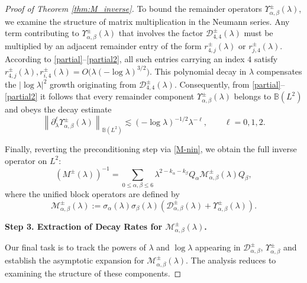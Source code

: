 \documentclass[reqno]{amsart}
\numberwithin{equation}{section}
\begin{document}
\begin{proof}[Proof of Theorem \ref{thm:M_inverse}]
To bound the remainder operators $\Upsilon_{\alpha,\beta}^\pm(\lambda)$, we examine the structure of matrix multiplication in the Neumann series.
Any term contributing to $\Upsilon_{\alpha,\beta}^\pm(\lambda)$ that involves the factor $\mathcal{D}_{4,4}^{\pm}(\lambda)$ must be multiplied by an adjacent remainder entry of the form $r_{4,j}^\pm(\lambda)$ or $r_{j,4}^\pm(\lambda)$. According to \eqref{partial}--\eqref{partial2}, all such entries carrying an index $4$ satisfy $r_{4,j}^{\pm}(\lambda), r_{i,4}^{\pm}(\lambda) = O\bigl(\lambda (-\log \lambda)^{3/2}\bigr)$. This polynomial decay in $\lambda$ compensates the $|\log \lambda|^2$ growth originating from $\mathcal{D}_{4,4}^{\pm}(\lambda)$. Consequently, from \eqref{partial}--\eqref{partial2} it follows that every remainder component $\Upsilon_{\alpha,\beta}^\pm(\lambda)$ belongs to $\mathbb{B}(L^2)$ and obeys the decay estimate
\begin{equation}\label{Upsilon}
\left\|\partial_\lambda^\ell \Upsilon_{\alpha,\beta}^\pm(\lambda)\right\|_{\mathbb{B}(L^2)} \lesssim (-\log \lambda)^{-1/2} \lambda^{-\ell}, \qquad \ell = 0,1,2. 
\end{equation}

Finally, reverting the preconditioning step via \eqref{M-nin}, we obtain the full inverse operator on $L^2$:
\[
\left(M^{\pm}(\lambda)\right)^{-1} = \sum_{0 \le \alpha, \beta \le 6} \lambda^{2 - k_\alpha - k_\beta} Q_\alpha \mathcal{M}_{\alpha,\beta}^{\pm}(\lambda) Q_\beta,
\]
where the unified block operators are  defined by
\[
\mathcal{M}_{\alpha,\beta}^{\pm}(\lambda) := \sigma_\alpha(\lambda) \sigma_\beta(\lambda) \left(\mathcal{D}_{\alpha,\beta}^\pm(\lambda) + \Upsilon_{\alpha,\beta}^\pm(\lambda) \right).
\]
	

	{\textbf{Step 3. Extraction of Decay Rates for $\mathcal{M}_{\alpha,\beta}^{\pm}(\lambda)$.}}
    
		Our final task is to track the powers of $\lambda$ and $\log \lambda$ appearing in $\mathcal{D}_{\alpha,\beta}^\pm$, $\Upsilon_{\alpha,\beta}^\pm$ and establish the asymptotic expansion for $\mathcal{M}_{\alpha,\beta}^{\pm}(\lambda)$.
	 The analysis reduces to examining the structure of these components.  
	

\end{proof}
\end{document}
